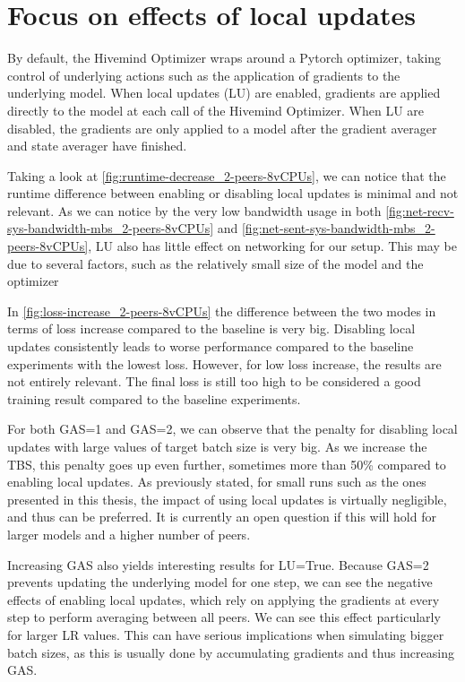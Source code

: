 \section{Focus on effects of local updates}\label{sec:focus-local-updates}
By default, the Hivemind Optimizer wraps around a Pytorch optimizer, taking control of underlying actions such as the application of gradients to the underlying model.
When local updates (LU) are enabled, gradients are applied directly to the model at each call of the Hivemind Optimizer.
When LU are disabled, the gradients are only applied to a model after the gradient averager and state averager have finished.

Taking a look at \autoref{fig:runtime-decrease_2-peers-8vCPUs}, we can notice that the runtime difference between enabling or disabling local updates is minimal and not relevant.
As we can notice by the very low bandwidth usage in both \autoref{fig:net-recv-sys-bandwidth-mbs_2-peers-8vCPUs} and \autoref{fig:net-sent-sys-bandwidth-mbs_2-peers-8vCPUs}, LU also has little effect on networking for our setup.
This may be due to several factors, such as the relatively small size of the model and the optimizer

In \autoref{fig:loss-increase_2-peers-8vCPUs} the difference between the two modes in terms of loss increase compared to the baseline is very big.
Disabling local updates consistently leads to worse performance compared to the baseline experiments with the lowest loss.
However, for low loss increase, the results are not entirely relevant.
The final loss is still too high to be considered a good training result compared to the baseline experiments.

For both GAS=1 and GAS=2, we can observe that the penalty for disabling local updates with large values of target batch size is very big.
As we increase the TBS, this penalty goes up even further, sometimes more than 50\% compared to enabling local updates.
As previously stated, for small runs such as the ones presented in this thesis, the impact of using local updates is virtually negligible, and thus can be preferred.
It is currently an open question if this will hold for larger models and a higher number of peers.

Increasing GAS also yields interesting results for LU=True.
Because GAS=2 prevents updating the underlying model for one step, we can see the negative effects of enabling local updates, which rely on applying the gradients at every step to perform averaging between all peers.
We can see this effect particularly for larger LR values.
This can have serious implications when simulating bigger batch sizes, as this is usually done by accumulating gradients and thus increasing GAS.


